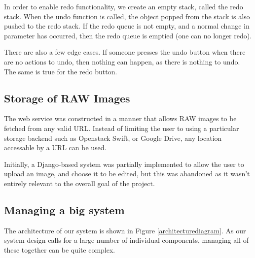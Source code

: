 \documentclass[10pt,a4paper]{article}
\begin{document}
In order to enable redo functionality, we create an empty stack, called the redo stack. When the undo function is called,
the object popped from the stack is also pushed to the redo stack. If the redo queue is not empty, and a normal change in parameter
has occurred, then the redo queue is emptied (one can no longer redo).

There are also a few edge cases. If someone presses the undo button when there are no actions to undo, then nothing can happen,
as there is nothing to undo. The same is true for the redo button.


\subsection{Storage of RAW Images}

The web service was constructed in a manner that allows RAW images to be fetched from any valid URL.
Instead of limiting the user to using a particular storage backend such as Openstack Swift, or Google Drive,
any location accessable by a URL can be used. 

Initially, a Django-based system was partially implemented to allow the user to upload an image, and choose it to
be edited, but this was abandoned as it wasn't entirely relevant to the overall goal of the project.


\subsection{Managing a big system}
The architecture of our system is shown in Figure \ref{architecturediagram}.
As our system design calls for a large number of individual components, managing all of these together can be quite complex.
\end{document}
